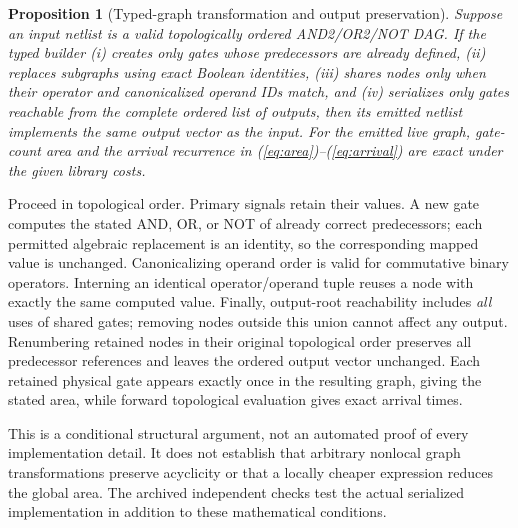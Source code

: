 \documentclass[journal,10pt]{IEEEtran}
\newtheorem{proposition}{Proposition}
\begin{document}
\begin{proposition}[Typed-graph transformation and output preservation]
Suppose an input netlist is a valid topologically ordered AND2/OR2/NOT DAG. If the typed builder (i) creates only gates whose predecessors are already defined, (ii) replaces subgraphs using exact Boolean identities, (iii) shares nodes only when their operator and canonicalized operand IDs match, and (iv) serializes only gates reachable from the \emph{complete ordered list} of outputs, then its emitted netlist implements the same output vector as the input. For the emitted live graph, gate-count area and the arrival recurrence in (\ref{eq:area})--(\ref{eq:arrival}) are exact under the given library costs.
\end{proposition}
\begin{IEEEproof}
Proceed in topological order. Primary signals retain their values. A new gate computes the stated AND, OR, or NOT of already correct predecessors; each permitted algebraic replacement is an identity, so the corresponding mapped value is unchanged. Canonicalizing operand order is valid for commutative binary operators. Interning an identical operator/operand tuple reuses a node with exactly the same computed value. Finally, output-root reachability includes \emph{all} uses of shared gates; removing nodes outside this union cannot affect any output. Renumbering retained nodes in their original topological order preserves all predecessor references and leaves the ordered output vector unchanged. Each retained physical gate appears exactly once in the resulting graph, giving the stated area, while forward topological evaluation gives exact arrival times.
\end{IEEEproof}
This is a conditional structural argument, not an automated proof of every implementation detail. It does not establish that arbitrary nonlocal graph transformations preserve acyclicity or that a locally cheaper expression reduces the global area. The archived independent checks test the actual serialized implementation in addition to these mathematical conditions.
\end{document}
